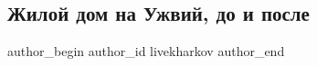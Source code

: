  
 
 
 
 

\subsection{Жилой дом на Ужвий, до и после}
\label{sec:17_02_2023.fb.livekharkov.1.zhiloi_dom_na_uzhvii}

\ifcmt
 author_begin
   author_id livekharkov
 author_end
\fi
